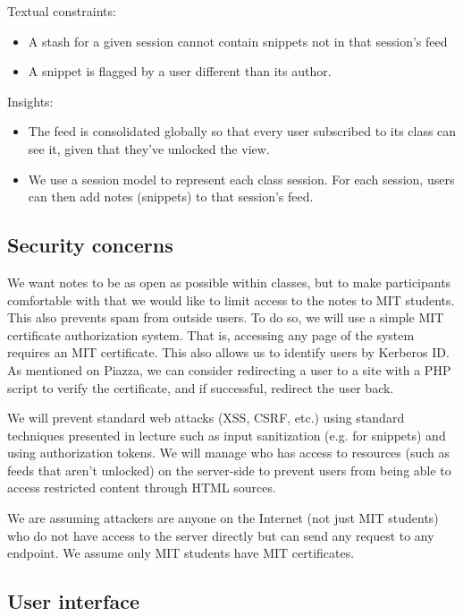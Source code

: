 \documentclass{article}
\begin{document}
Textual constraints:
\begin{itemize}
\item A stash for a given session cannot contain snippets not in that session's feed
\item A snippet is flagged by a user different than its author.
\end{itemize}

Insights:
\begin{itemize}
\item The feed is consolidated globally so that every user subscribed to its class can see it, given that they've unlocked the view.
\item We use a session model to represent each class session. For each session, users can then add notes (snippets) to that session's feed.
\end{itemize}

\subsection*{Security concerns}

We want notes to be as open as possible within classes, but to make participants comfortable with that we would like to limit access to the notes to MIT students. This also prevents spam from outside users. To do so, we will use a simple MIT certificate authorization system. That is, accessing any page of the system requires an MIT certificate. This also allows us to identify users by Kerberos ID. As mentioned on Piazza, we can consider redirecting a user to a site with a PHP script to verify the certificate, and if successful, redirect the user back.

We will prevent standard web attacks (XSS, CSRF, etc.) using standard techniques presented in lecture such as input sanitization (e.g. for snippets) and using authorization tokens. We will manage who has access to resources (such as feeds that aren't unlocked) on the server-side to prevent users from being able to access restricted content through HTML sources.

We are assuming attackers are anyone on the Internet (not just MIT students) who do not have access to the server directly but can send any request to any endpoint. We assume only MIT students have MIT certificates.


\subsection*{User interface}
\end{document}
